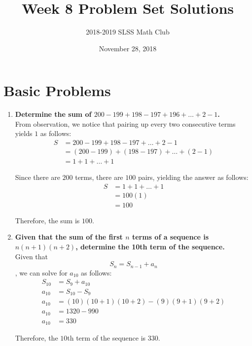 \documentclass[12pt]{article}
\title{Week 8 Problem Set Solutions \vspace{-3mm}}
\author{2018-2019 SLSS Math Club\vspace{-5mm}}
\date{November 28, 2018\vspace{-5mm}}
\begin{document}
\maketitle

\section*{Basic Problems}
\begin{enumerate}
    \item \textbf{Determine the sum of $200 - 199 + 198 - 197 + 196 + \dots + 2 - 1$.} \\
    
    From observation, we notice that pairing up every two consecutive terms yields $1$ as follows:
    \begin{align*}
        S & = 200 - 199 + 198 - 197 + \dots + 2 - 1 \\
        & = (200 - 199) + (198 - 197) + \dots + (2 - 1) \\
        & = 1 + 1 + \dots + 1
    \end{align*}
    
    Since there are $200$ terms, there are $100 $ pairs, yielding the answer as follows:
    \begin{align*}
        S & = 1 + 1 + \dots + 1 \\
        & = 100(1) \\
        & = 100
    \end{align*}
    
    Therefore, the sum is $100$.
    
    \item \textbf{Given that the sum of the first $n$ terms of a sequence is $n(n + 1)(n + 2)$, determine the 10th term of the sequence.} \\
    
    Given that $$S_n = S_{n - 1} + a_n$$, we can solve for $a_{10}$ as follows:
    \begin{align*}
        S_{10} & = S_{9} + a_{10} \\
        a_{10} & = S_{10} - S_{9} \\
        a_{10} & = (10)(10 + 1)(10 + 2) - (9)(9 + 1)(9 + 2) \\
        a_{10} & = 1320 - 990 \\
        a_{10} & = 330
    \end{align*}
    
    Therefore, the $10$th term of the sequence is $330$.
    
    \newpage
    

\end{enumerate}
\end{document}
